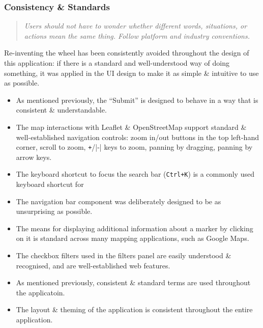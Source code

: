 \documentclass[a4paper,11pt]{report}
\begin{document}
\subsubsection{Consistency \& Standards}
\begin{quote}
    \textit{ Users should not have to wonder whether different words, situations, or actions mean the same thing. Follow platform and industry conventions. }
\end{quote}

Re-inventing the wheel has been consistently avoided throughout the design of this application:
if there is a standard and well-understood way of doing something, it was applied in the UI design to make it as simple \& intuitive to use as possible.
\begin{itemize}
    \item   As mentioned previously, the ``Submit'' is designed to behave in a way that is consistent \& understandable.
    \item   The map interactions with Leaflet \& OpenStreetMap support standard \& well-established navigation controls:
            zoom in/out buttons in the top left-hand corner, scroll to zoom, \verb|+|/|-| keys to zoom, panning by dragging, panning by arrow keys.
    \item   The keyboard shortcut to focus the search bar (\verb|Ctrl+K|) is a commonly used keyboard shortcut for 
    \item   The navigation bar component was deliberately designed to be as unsurprising as possible.
    \item   The means for displaying additional information about a marker by clicking on it is standard across many mapping applications, such as Google Maps\supercite{gmaps}.
    \item   The checkbox filters used in the filters panel are easily understood \& recognised, and are well-established web features.
    \item   As mentioned previously, consistent \& standard terms are used throughout the applicatoin.
    \item   The layout \& theming of the application is consistent throughout the entire application.
\end{itemize}
\end{document}
